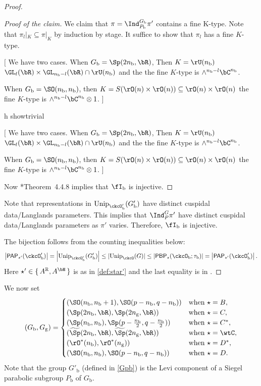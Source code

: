 \documentclass[12pt,a4paper]{amsart}
\newcommand{\trivial}[2][]{\if\relax\detokenize{#1}\relax
  {%
      \color{orange} \vspace{0em} $[$  #2 $]$
      \color{black}
  }
  \else
\ifx#1h
\ifcsname showtrivial\endcsname
{%
    \color{orange} \vspace{0em}  $[$ #2 $]$
    \color{black}
}
\fi
\else {\red Wrong argument!} \fi
\fi
}
\def\subset{\subseteq}
\def\abs#1{\left|{#1}\right|}
\newcommand{\R}{\mathbb R}
\numberwithin{equation}{section}
\theoremstyle{remark}
\def\Unip{\mathrm{Unip}}
\def\PP{\mathsf{PAP}}
\def\PBP{\mathsf{PBP}}
\def\nnb{n_{\mathrm b}}
\def\Gb{G_{\mathrm b}}
\def\Pb{P_{\mathrm b}}
\begin{document}
\begin{proof}
\begin{proof}[Proof of the claim]
    We claim that $\pi = \Ind_{\Pb}^{\Gb} \pi'$ contains a fine K-type.
    Note that $\pi_{l}|_{K}\subseteq \pi|_{K}$ by induction by stage.
    It suffice to show that $\pi_{l}$ has a fine $K$-type.
    \trivial[]{
      We have two cases. When $\Gb = \Sp(2\nnb,\bR)$, Then $K = \rU(\nnb)$
      $\GL_{l}(\bR)\times \GL_{\nnb-l}(\bR)\cap \rU(\nnb)$ and the the fine
      $K$-type is $\wedge^{\nnb-l}\bC^{\nnb}$.

      When $\Gb = \SO(\nnb,\nnb)$, then
      $K = S(\rO(n)\times \rO(n))\subset \rO(n)\times \rO(n)$ the fine $K$-type is
      $\wedge^{\nnb-l}\bC^{\nnb}\otimes 1$.
    }
    Now \cite{Vg}*{Theorem~4.4.8} implies that $\fIb$ is injective.
  \end{proof}

  Note that representations in $\Unip_{\ckcO'_{\mathrm b}}(G'_{\mathrm b})$ have distinct
  cuspidal data/Langlands parameters. This implies that $\Ind_{P}^{G}\pi'$ have distinct cuspidal data/Langlands parameters as $\pi'$ varies.
  Therefore, $\fI_{\mathrm b}$ is injective.

  The bijection follows from the counting
  inequalities below:
  \[
    \abs{\PP_{\star'}(\ckcO'_{\mathrm b})}=\abs{\Unip_{\ckcO'_{\mathrm b}}(G'_{\mathrm b})}\leq \abs{\Unip_{\ckcO}(G)}
    \leq \abs{\PBP_{\star}(\ckcO_{\mathrm b}; \tau_{\mathrm b})} = \abs{\PP_{\star'}(\ckcO'_{\mathrm b})}.
  \]
  Here $\star' \in \set{A^\R,A^{\bH}}$ is as in \eqref{def:star'} and the last equality is in .
\end{proof}


We now set
\[
  (G_{\mathrm b},G_{\mathrm g}) =
  \begin{cases}
    (\SO(n_{\mathrm b},n_{\mathrm b}+1),\SO(p-n_{\mathrm b},q-n_{\mathrm b})) & \text{when } \star = B, \\
    (\Sp(2n_{\mathrm b},\bR),\Sp(2n_{\mathrm g},\bR)) & \text{when } \star = C, \\
    (\Sp(n_{\mathrm b},n_{\mathrm b}), \Sp(p-\frac{n_{\mathrm b}}{2},q-\frac{n_{\mathrm b}}{2})) & \text{when } \star = C^{*}, \\
    (\widetilde{\Sp}(2n_{\mathrm b},\bR),\widetilde \Sp(2n_{\mathrm g},\bR)) & \text{when } \star = \wtC, \\
    (\rO^{*}(n_{\mathrm b}), \rO^{*}(n_{\mathrm g})) & \text{when } \star = D^{*}, \\
    (\SO(n_{\mathrm b},n_{\mathrm b}), \SO(p-n_{\mathrm b},q-n_{\mathrm b}) )& \text{when } \star = D. \\
  \end{cases}
\]
Note that the group $G'_{\mathrm b}$ (defined in \eqref{Gpb}) is the Levi component of a Siegel parabolic subgroup $P_{\mathrm b}$ of $G_{\mathrm b}$.
\end{document}
